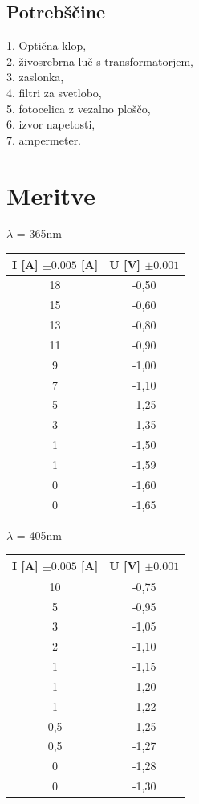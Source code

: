 \documentclass[a4paper]{report}
\begin{document}
\section*{Potrebščine}

1. Optična klop,\\
2. živosrebrna luč s transformatorjem,\\
3. zaslonka,\\
4. filtri za svetlobo,\\
5. fotocelica z vezalno ploščo,\\
6. izvor napetosti,\\
7. ampermeter.


\chapter*{Meritve}


\noindent $\lambda$ = 365nm \\
\begin{center}
\begin{tabular}{ |c|c| } 
 \hline
 I [A] $\pm 0.005$ [A] & U [V] $\pm 0.001$\\
 \hline
    18    & -0,50 \\
    15    & -0,60 \\
    13    & -0,80 \\
    11    & -0,90 \\
    9     & -1,00 \\
    7     & -1,10 \\
    5     & -1,25 \\
    3     & -1,35 \\
    1     & -1,50 \\
    1     & -1,59 \\
    0     & -1,60 \\
    0     & -1,65 \\
 
\hline
\end{tabular}
\end{center}


\noindent $\lambda$ = 405nm \\
\begin{center}
\begin{tabular}{ |c|c| } 
 \hline
 I [A] $\pm 0.005$ [A] & U [V] $\pm 0.001$\\
 \hline
    10    & -0,75 \\
    5     & -0,95 \\
    3     & -1,05 \\
    2     & -1,10 \\
    1     & -1,15 \\
    1     & -1,20 \\
    1     & -1,22 \\
    0,5   & -1,25 \\
    0,5   & -1,27 \\
    0     & -1,28 \\
    0     & -1,30 \\
\hline

\end{tabular}
\end{center}
\end{document}
